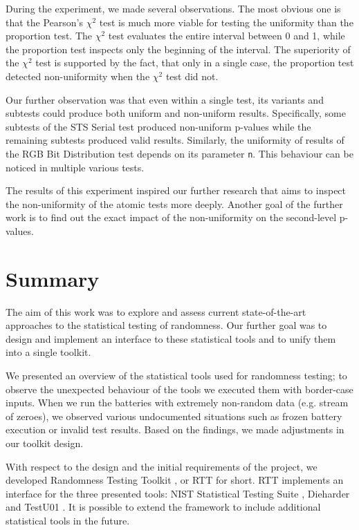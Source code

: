 \documentclass[
	digital,    %
	oneside,    %
	color,
	11pt,
	nocover,
	notable,
	nolof,
	nolot,
]{fithesis3}
\theoremstyle{definition}
\theoremstyle{remark}
\begin{document}
During the experiment, we made several observations. The most obvious one is that the Pearson's $\chi^2$ test is much more viable for testing the uniformity than the proportion test. The $\chi^2$ test evaluates the entire interval between 0 and 1, while the proportion test inspects only the beginning of the interval. The superiority of the $\chi^2$ test is supported by the fact, that only in a single case, the proportion test detected non-uniformity when the $\chi^2$ test did not. 

Our further observation was that even within a single test, its variants and subtests could produce both uniform and non-uniform results. Specifically, some subtests of the STS Serial test produced non-uniform p-values while the remaining subtests produced valid results. Similarly, the uniformity of results of the RGB Bit Distribution test depends on its parameter \texttt{n}. This behaviour can be noticed in multiple various tests.

The results of this experiment inspired our further research that aims to inspect the non-uniformity of the atomic tests more deeply. Another goal of the further work is to find out the exact impact of the non-uniformity on the second-level p-values.

\chapter{Summary}
\label{chap:summary}
The aim of this work was to explore and assess current state-of-the-art approaches to the statistical testing of randomness. Our further goal was to design and implement an interface to these statistical tools and to unify them into a single toolkit.

We presented an overview of the statistical tools used for randomness testing; to observe the unexpected behaviour of the tools we executed them with border-case inputs. When we run the batteries with extremely non-random data (e.g. stream of zeroes), we observed various undocumented situations such as frozen battery execution or invalid test results. Based on the findings, we made adjustments in our toolkit design. 

With respect to the design and the initial requirements of the project, we developed Randomness Testing Toolkit \cite{rtt-github}, or RTT for short. RTT implements an interface for the three presented tools: NIST Statistical Testing Suite \cite{nist-sts}, Dieharder \cite{dieharder} and TestU01 \cite{testu01-paper}. It is possible to extend the framework to include additional statistical tools in the future.
\end{document}
